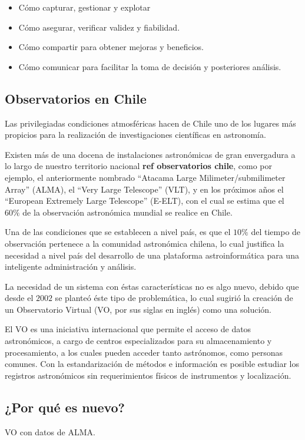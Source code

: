 \begin{itemize}
    \item Cómo capturar, gestionar y explotar
    \item Cómo asegurar, verificar validez y fiabilidad.
    \item Cómo compartir para obtener mejoras y beneficios.
    \item Cómo comunicar para facilitar la toma de decisión y posteriores análisis.
\end{itemize}

\subsection{Observatorios en Chile}

Las privilegiadas condiciones atmosféricas hacen de Chile uno de los lugares más
propicios para la realización de investigaciones científicas en astronomía.

Existen más de una docena de instalaciones astronómicas de gran envergadura a lo
largo de nuestro territorio nacional {\bf ref observatorios chile}, como por ejemplo,
el anteriormente nombrado ``Atacama Large Milimeter/submilimeter Array'' (ALMA),
el ``Very Large Telescope'' (VLT), y en los próximos años el ``European Extremely
Large Telescope'' (E-ELT), con el cual se estima que el $60\%$ de la observación
astronómica mundial se realice en Chile.

Una de las condiciones que se establecen a nivel país, es que el $10\%$ del tiempo
de observación pertenece a la comunidad astronómica chilena, lo cual justifica
la necesidad a nivel país del desarrollo de una plataforma astroinformática
para una inteligente administración y análisis.

La necesidad de un sistema con éstas características no es algo nuevo,
debido que desde el $2002$ se planteó éste tipo de problemática, lo cual sugirió
la creación de un Observatorio Virtual (VO, por sus siglas en inglés) como una solución.

El VO es una iniciativa internacional que permite el acceso de datos astronómicos,
a cargo de centros especializados para su almacenamiento y procesamiento,
a los cuales pueden acceder tanto astrónomos, como personas comunes.
Con la estandarización de métodos e información es posible estudiar los registros
astronómicos sin requerimientos físicos de instrumentos y localización.

\subsection{¿Por qué es nuevo?}
VO con datos de ALMA.

